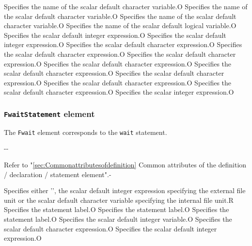 \begin{XcodeMLControlList}
{Specifies the name of the scalar default character variable.}{O}
{Specifies the name of the scalar default character variable.}{O}
{Specifies the name of the scalar default character variable.}{O}
{Specifies the name of the scalar default logical variable.}{O}
{Specifies the scalar default integer expression.}{O}
{Specifies the scalar default integer expression.}{O}
{Specifies the scalar default character expression.}{O}
{Specifies the scalar default character expression.}{O}
{Specifies the scalar default character expression.}{O}
{Specifies the scalar default character expression.}{O}
{Specifies the scalar default character expression.}{O}
{Specifies the scalar default character expression.}{O}
{Specifies the scalar default character expression.}{O}
{Specifies the scalar default character expression.}{O}
{Specifies the scalar integer expression.}{O}
\end{XcodeMLControlList}


\subsubsection{ {\tt FwaitStatement} element}

The {\tt Fwait} element corresponds to the {\tt wait} statement.


\begin{XcodeMLChildElements}
\XcodeMLElementDef{-}
{-}{-}
\end{XcodeMLChildElements}

\begin{XcodeMLAttributes}
{Refer to "\ref{sec:Commonattributesofdefinition} Common attributes of the definition / declaration / statement element".}{-}
\end{XcodeMLAttributes}

\begin{XcodeMLControlList}
{Specifies either '{\tt *}', the scalar default integer expression specifying the external file unit or the scalar default character variable specifying the internal file unit.}{R}
{Specifies the statement label.}{O}
{Specifies the statement label.}{O}
{Specifies the statement label.}{O}
{Specifies the scalar default integer variable.}{O}
{Specifies the scalar default character expression.}{O}
{Specifies the scalar default integer expression.}{O}
\end{XcodeMLControlList}

